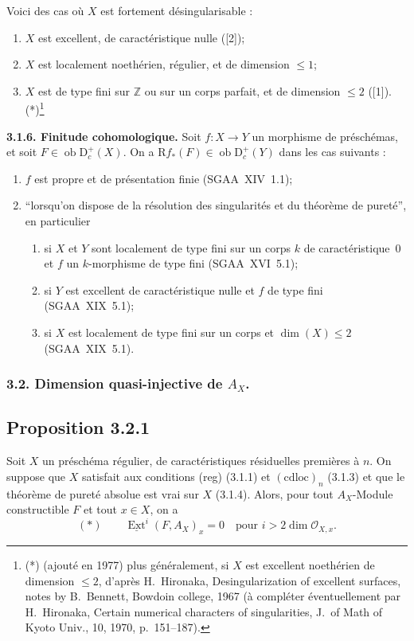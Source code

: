 \documentclass[11pt]{article}
\providecommand{\cO}{\mathcal{O}}
\DeclareMathOperator{\Ext}{Ext}
\newcommand{\R}{\mathrm{R}}\newcommand{\RHomCore}{\mathrm{RHom}}
\newcommand{\D}{\mathrm{D}}
\newcommand{\Z}{\mathbb{Z}}
\newcommand{\ob}{\operatorname{ob}}
\providecommand{\ob}{\operatorname{ob}}
\providecommand{\R}{\mathrm R}
\providecommand{\Z}{\mathbb Z}
\begin{document}
Voici des cas où $X$ est fortement désingularisable :
\begin{enumerate}
\item[a)] $X$ est excellent, de caractéristique nulle ([2]);
\item[b)] $X$ est localement noethérien, régulier, et de dimension $\leqslant 1$;
\item[c)] $X$ est de type fini sur $\Z$ ou sur un corps parfait, et de dimension $\leqslant 2$ ([1]).(*)\footnote{(*) (ajouté en 1977) plus généralement, si $X$ est excellent noethérien de dimension $\leqslant 2$, d'après H.~Hironaka, Desingularization of excellent surfaces, notes by B.~Bennett, Bowdoin college, 1967 (à compléter éventuellement par H.~Hironaka, Certain numerical characters of singularities, J.~of Math of Kyoto Univ., 10, 1970, p.~151--187).}
\end{enumerate}

\textbf{3.1.6. Finitude cohomologique.} Soit $f : X \to Y$ un morphisme de préschémas, et soit $F \in \ob \D_c^{+}(X)$. On a $\R f_{*}(F) \in \ob \D_c^{+}(Y)$ dans les cas suivants :
\begin{enumerate}
\item[a)] $f$ est propre et de présentation finie (SGAA~XIV~1.1);
\item[b)] ``lorsqu'on dispose de la résolution des singularités et du théorème de pureté'', en particulier
\begin{enumerate}
\item[(i)] si $X$ et $Y$ sont localement de type fini sur un corps $k$ de caractéristique~0 et $f$ un $k$-morphisme de type fini (SGAA~XVI~5.1);
\item[(ii)] si $Y$ est excellent de caractéristique nulle et $f$ de type fini (SGAA~XIX~5.1);
\item[(iii)] si $X$ est localement de type fini sur un corps et $\dim(X) \leqslant 2$ (SGAA~XIX~5.1).
\end{enumerate}
\end{enumerate}

\subsubsection{3.2. Dimension quasi-injective de \texorpdfstring{$A_X$}{A\_X}.}

\subsection*{Proposition 3.2.1}
Soit $X$ un préschéma régulier, de caractéristiques résiduelles premières à $n$. On suppose que $X$ satisfait aux conditions (reg) (3.1.1) et $(\mathrm{cdloc})_n$ (3.1.3) et que le théorème de pureté absolue est vrai sur $X$ (3.1.4). Alors, pour tout $A_X$-Module constructible $F$ et tout $x \in X$, on a
\[
(*) \qquad \underline{\Ext}^i(F, A_X)_x = 0 \quad \text{pour } i > 2\dim \cO_{X,x}.
\]
\end{document}
